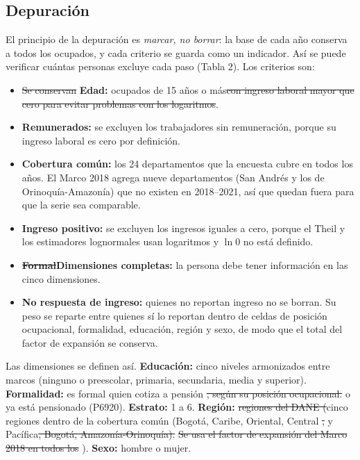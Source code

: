 \documentclass[12pt,letterpaper]{article}
\providecommand{\DIFaddtex}[1]{{\protect\color{BLUE}#1}} %
\providecommand{\DIFdeltex}[1]{{\protect\color{RED}\sout{#1}}} %
\providecommand{\DIFaddtex}[1]{\texorpdfstring{\DIFaddtex{#1}}{#1}} %
\providecommand{\DIFdeltex}[1]{\texorpdfstring{\DIFdeltex{#1}}{}} %
\providecommand{\DIFaddbegin}{}\providecommand{\DIFaddend}{} %
\providecommand{\DIFdelbegin}{}\providecommand{\DIFdelend}{} %
\providecommand{\DIFadd}[1]{\texorpdfstring{\DIFaddtex{#1}}{#1}} %
\providecommand{\DIFdel}[1]{\texorpdfstring{\DIFdeltex{#1}}{}} %
\begin{document}
\subsection{Depuración}

\DIFaddbegin \DIFadd{El principio de la depuración es }\emph{\DIFadd{marcar, no borrar}}\DIFadd{: la base de cada año conserva a todos los ocupados, y cada criterio se guarda como un indicador. Así se puede verificar cuántas personas excluye cada paso (Tabla 2). Los criterios son:
}

\DIFaddend \begin{itemize}[leftmargin=0.75in]
  \item \DIFdelbegin \DIFdel{Se conservan }\DIFdelend \DIFaddbegin \textbf{\DIFadd{Edad:}} \DIFaddend ocupados de 15 años o más\DIFdelbegin \DIFdel{con ingreso laboral mayor que cero para evitar problemas con los logaritmos}\DIFdelend \DIFaddbegin \DIFadd{.
  }\item \textbf{\DIFadd{Remunerados:}} \DIFadd{se excluyen los trabajadores sin remuneración, porque su ingreso laboral es cero por definición.
  }\item \textbf{\DIFadd{Cobertura común:}} \DIFadd{los 24 departamentos que la encuesta cubre en todos los años. El Marco 2018 agrega nueve departamentos (San Andrés y los de Orinoquía-Amazonía) que no existen en 2018--2021, así que quedan fuera para que la serie sea comparable.
  }\item \textbf{\DIFadd{Ingreso positivo:}} \DIFadd{se excluyen los ingresos iguales a cero, porque el Theil y los estimadores lognormales usan logaritmos y $\ln 0$ no está definido}\DIFaddend .
  \item \textbf{\DIFdelbegin \DIFdel{Formal}\DIFdelend \DIFaddbegin \DIFadd{Dimensiones completas}\DIFaddend :} \DIFaddbegin \DIFadd{la persona debe tener información en las cinco dimensiones.
  }\item \textbf{\DIFadd{No respuesta de ingreso:}} \DIFadd{quienes no reportan ingreso no se borran. Su peso se reparte entre quienes sí lo reportan dentro de celdas de posición ocupacional, formalidad, educación, región y sexo, de modo que el total del factor de expansión se conserva.
}\end{itemize}

\DIFadd{Las dimensiones se definen así. }\textbf{\DIFadd{Educación:}} \DIFadd{cinco niveles armonizados entre marcos (ninguno o preescolar, primaria, secundaria, media y superior). }\textbf{\DIFadd{Formalidad:}} \DIFadd{es formal quien }\DIFaddend cotiza a pensión \DIFdelbegin \DIFdel{, según su posición ocupacional. }\DIFdelend \DIFaddbegin \DIFadd{o ya está pensionado (P6920). }\textbf{\DIFadd{Estrato:}} \DIFadd{1 a 6. }\DIFaddend \textbf{Región:} \DIFdelbegin \DIFdel{regiones del DANE (}\DIFdelend \DIFaddbegin \DIFadd{cinco regiones dentro de la cobertura común (Bogotá, }\DIFaddend Caribe, Oriental, Central \DIFdelbegin \DIFdel{, }\DIFdelend \DIFaddbegin \DIFadd{y }\DIFaddend Pacífica\DIFdelbegin \DIFdel{, Bogotá, Amazonía-Orinoquía). }%
\DIFdel{Se usa el factor de expansión del Marco 2018 en todos los }\DIFdelend \DIFaddbegin \DIFadd{). }\textbf{\DIFadd{Sexo:}} \DIFadd{hombre o mujer.
}
\end{document}
